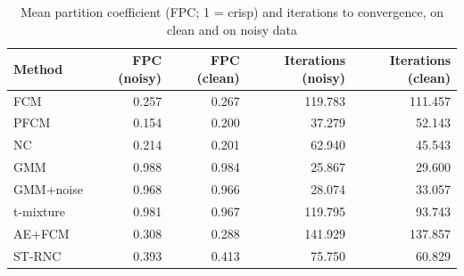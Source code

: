 \begin{table}[t]
\centering
\scriptsize
\setlength{\tabcolsep}{3pt}
\caption{Mean partition coefficient (FPC; 1 = crisp) and iterations to convergence, on clean and on noisy data}
\label{tab:fpc}
\begin{tabular}{lrrrr}
\toprule
Method & FPC (noisy) & FPC (clean) & Iterations (noisy) & Iterations (clean) \\
\midrule
FCM & 0.257 & 0.267 & 119.783 & 111.457 \\
PFCM & 0.154 & 0.200 & 37.279 & 52.143 \\
NC & 0.214 & 0.201 & 62.940 & 45.543 \\
GMM & 0.988 & 0.984 & 25.867 & 29.600 \\
GMM+noise & 0.968 & 0.966 & 28.074 & 33.057 \\
t-mixture & 0.981 & 0.967 & 119.795 & 93.743 \\
AE+FCM & 0.308 & 0.288 & 141.929 & 137.857 \\
ST-RNC & 0.393 & 0.413 & 75.750 & 60.829 \\
\bottomrule
\end{tabular}
\end{table}
